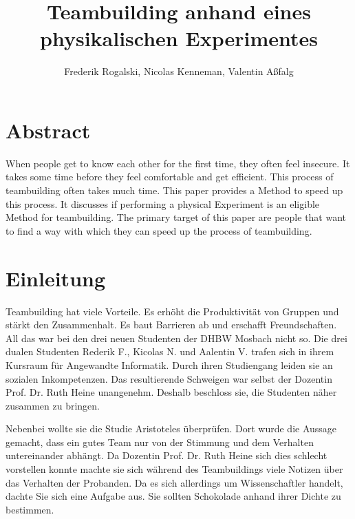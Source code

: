 \documentclass[12pt]{scrartcl}
\title{Teambuilding anhand eines physikalischen Experimentes}
\author{Frederik Rogalski, Nicolas Kenneman, Valentin Aßfalg}
\begin{document}
\maketitle

\section{Abstract}
When people get to know each other for the first time, they often feel insecure. It takes some time before they feel comfortable and get efficient. This process of teambuilding often takes much time. This paper provides a Method to speed up this process. It discusses if performing a physical Experiment is an eligible Method for teambuilding. The primary target of this paper are people that want to find a way with which they can speed up the process of teambuilding.

\section{Einleitung}
Teambuilding hat viele Vorteile. Es erhöht die Produktivität von Gruppen und stärkt den Zusammenhalt. Es baut Barrieren ab und erschafft Freundschaften. All das war bei den drei neuen Studenten der DHBW Mosbach nicht so. Die drei dualen Studenten Rederik F., Kicolas N. und Aalentin V. trafen sich in ihrem Kursraum für Angewandte Informatik. Durch ihren Studiengang leiden sie an sozialen Inkompetenzen. Das resultierende Schweigen war selbst der Dozentin Prof. Dr. Ruth Heine unangenehm. Deshalb beschloss sie, die Studenten näher zusammen zu bringen. 

Nebenbei wollte sie die Studie Aristoteles \cite{Aristoteles} überprüfen. Dort wurde die Aussage gemacht, dass ein gutes Team nur von der Stimmung und dem Verhalten untereinander abhängt. Da Dozentin Prof. Dr. Ruth Heine sich dies schlecht vorstellen konnte machte sie sich während des Teambuildings viele Notizen über das Verhalten der Probanden. Da es sich allerdings um Wissenschaftler handelt, dachte Sie sich eine Aufgabe aus. Sie sollten Schokolade anhand ihrer Dichte zu bestimmen.
\end{document}
